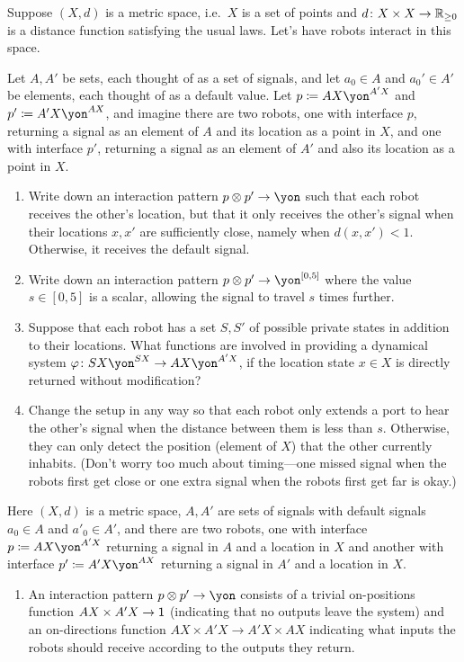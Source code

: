 \documentclass[Book-Poly]{subfiles}
\begin{document}
\begin{exercise}
Suppose $(X,d)$ is a metric space, i.e.\ $X$ is a set of points and $d\colon X\times X\to\mathbb{R}_{\geq0}$ is a distance function satisfying the usual laws.
Let's have robots interact in this space.

Let $A,A'$ be sets, each thought of as a set of signals, and let $a_0\in A$ and $a_0'\in A'$ be elements, each thought of as a default value. Let $p\coloneqq AX\yon^{A'X}$ and $p'\coloneqq A'X\yon^{AX}$, and imagine there are two robots, one with interface $p$, returning a signal as an element of $A$ and its location as a point in $X$, and one with interface $p'$, returning a signal as an element of $A'$ and also its location as a point in $X$.
\begin{enumerate}
	\item Write down an interaction pattern $p\otimes p'\to\yon$ such that each robot receives the other's location, but that it only receives the other's signal when their locations $x,x'$ are sufficiently close, namely when $d(x,x')<1$.
	Otherwise, it receives the default signal.
	\item Write down an interaction pattern $p\otimes p'\to\yon^{[0,5]}$ where the value $s\in [0,5]$ is a scalar, allowing the signal to travel $s$ times further.
	\item Suppose that each robot has a set $S,S'$ of possible private states in addition to their locations.
	What functions are involved in providing a dynamical system $\varphi\colon SX\yon^{SX}\to AX\yon^{A'X}$, if the location state $x\in X$ is directly returned without modification?
	\item Change the setup in any way so that each robot only extends a port to hear the other's signal when the distance between them is less than $s$. Otherwise, they can only detect the position (element of $X$) that the other currently inhabits.
	(Don't worry too much about timing---one missed signal when the robots first get close or one extra signal when the robots first get far is okay.)
\qedhere
\end{enumerate}
\begin{solution}
Here $(X,d)$ is a metric space, $A,A'$ are sets of signals with default signals $a_0\in A$ and $a'_0\in A'$, and there are two robots, one with interface $p\coloneqq AX\yon^{A'X}$ returning a signal in $A$ and a location in $X$ and another with interface $p'\coloneqq A'X\yon^{AX}$ returning a signal in $A'$ and a location in $X$.
\begin{enumerate}
    \item An interaction pattern $p\otimes p'\to\yon$ consists of a trivial on-positions function $AX\times A'X\to\textsf{1}$ (indicating that no outputs leave the system) and an on-directions function $AX\times A'X\to A'X\times AX$ indicating what inputs the robots should receive according to the outputs they return.

\end{enumerate}
\end{solution}
\end{exercise}
\end{document}
